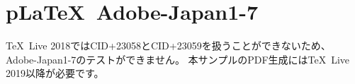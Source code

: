\documentclass{jsarticle}
\begin{document}
\section{p\LaTeX~Adobe-Japan1-7}

\TeX~Live 2018ではCID+23058とCID+23059を扱うことができないため、
Adobe-Japan1-7のテストができません。
本サンプルのPDF生成には\TeX~Live 2019以降が必要です。


\end{document}
